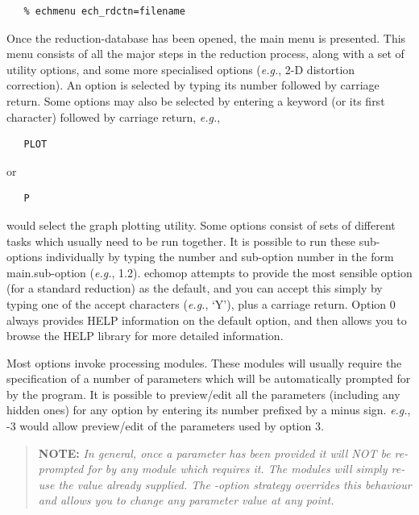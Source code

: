 \documentclass[11pt,twoside]{article}
\newcommand{\myindex}[1]{\index{#1}}
\renewcommand{\myindex}[1]{}
\begin{document}
\begin{verbatim}
   % echmenu ech_rdctn=filename
\end{verbatim}

Once the reduction-database has been opened, the main menu is
presented.  This menu consists of all the major steps in the reduction
process, along with a set of utility options, and some more specialised
options ({\it{e.g.}}, 2-D distortion correction). \myindex{Option!selection
of}  An option is selected by typing its number followed by carriage
return.  Some options may also be selected by entering a keyword (or its
first character) followed by carriage return, {\it{e.g.}},

\begin{verbatim}
   PLOT
\end{verbatim}

or

\begin{verbatim}
   P
\end{verbatim}

would select the graph plotting utility.  Some options consist of sets of
different tasks which usually need to be run together.  It is possible to
run these sub-options individually by typing the number and sub-option
number in the form main.sub-option  ({\it{e.g.}}, 1.2).
\myindex{Sub-options!selection of} {\sc echomop} attempts to provide the most
sensible option (for a standard reduction) as the default, and you
can accept this simply by typing one of the accept characters ({\it{e.g.}},
`Y'), plus a carriage return. \myindex{Help} Option 0 always
provides HELP information on the default option, and then allows you
to browse the HELP library for more detailed information.

Most options invoke processing modules.  These modules will usually
require the specification of a number of parameters which will be
automatically prompted for by the program.  It is possible to
preview/edit all the parameters (including any hidden ones) for any
option by entering its number prefixed by a minus sign. {\it{e.g.}},
-3 would allow preview/edit of the parameters used by option 3.
\myindex{Prompt}

\begin{quote}

  {\bf NOTE:} {\sl In general, once a parameter has been provided
  it will NOT be re-prompted for by any module which requires it.
  The modules will simply re-use the value already supplied. The -option
  strategy overrides this behaviour and allows you to change any
  parameter value at any point.}

\end{quote}
\end{document}
